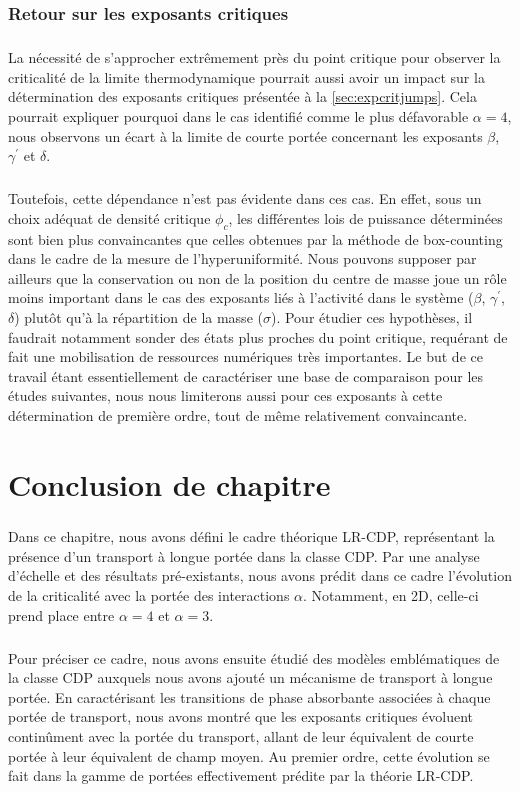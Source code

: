 \subsubsection{Retour sur les exposants critiques}

\subparagraph{}La nécessité de s'approcher extrêmement près du point critique pour observer la criticalité de la limite thermodynamique pourrait aussi avoir un impact sur la détermination des exposants critiques présentée à la \autoref{sec:expcritjumps}. Cela pourrait expliquer pourquoi dans le cas identifié comme le plus défavorable $\alpha=4$, nous observons un écart à la limite de courte portée concernant les exposants $\beta$, $\gamma^\prime$ et $\delta$.

\subparagraph{}Toutefois, cette dépendance n'est pas évidente dans ces cas. En effet, sous un choix adéquat de densité critique $\phi_c$, les différentes lois de puissance déterminées sont bien plus convaincantes que celles obtenues par la méthode de box-counting dans le cadre de la mesure de l'hyperuniformité. Nous pouvons supposer par ailleurs que la conservation ou non de la position du centre de masse joue un rôle moins important dans le cas des exposants liés à l'activité dans le système ($\beta$, $\gamma^\prime$, $\delta$) plutôt qu'à la répartition de la masse ($\sigma$). Pour étudier ces hypothèses, il faudrait notamment sonder des états plus proches du point critique, requérant de fait une mobilisation de ressources numériques très importantes. Le but de ce travail étant essentiellement de caractériser une base de comparaison pour les études suivantes, nous nous limiterons aussi pour ces exposants à cette détermination de première ordre, tout de même relativement convaincante.

\section{Conclusion de chapitre}

\subparagraph{}Dans ce chapitre, nous avons défini le cadre théorique LR-CDP, représentant la présence d'un transport à longue portée dans la classe CDP. Par une analyse d'échelle et des résultats pré-existants, nous avons prédit dans ce cadre l'évolution de la criticalité avec la portée des interactions $\alpha$. Notamment, en 2D, celle-ci prend place entre $\alpha=4$ et $\alpha=3$.


\subparagraph{}Pour préciser ce cadre, nous avons ensuite étudié des modèles emblématiques de la classe CDP auxquels nous avons ajouté un mécanisme de transport à longue portée. En caractérisant les transitions de phase absorbante associées à chaque portée de transport, nous avons montré que les exposants critiques évoluent continûment avec la portée du transport, allant de leur équivalent de courte portée à leur équivalent de champ moyen. Au premier ordre, cette évolution se fait dans la gamme de portées effectivement prédite par la théorie LR-CDP.

